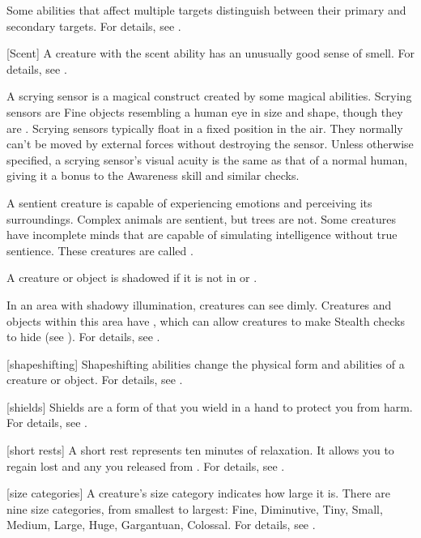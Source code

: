  Some abilities that affect multiple targets distinguish between their primary and secondary targets.
For details, see .

[Scent] A creature with the scent ability has an unusually good sense of smell.
For details, see .

 A scrying sensor is a magical construct created by some magical abilities.
Scrying sensors are Fine objects resembling a human eye in size and shape, though they are .
Scrying sensors typically float in a fixed position in the air.
They normally can't be moved by external forces without destroying the sensor.
Unless otherwise specified, a scrying sensor's visual acuity is the same as that of a normal human, giving it a  bonus to the Awareness skill and similar checks.

 A sentient creature is capable of experiencing emotions and perceiving its surroundings.
Complex animals are sentient, but trees are not.
Some creatures have incomplete minds that are capable of simulating intelligence without true sentience.
These creatures are called .

 A creature or object is shadowed if it is not in  or .

 In an area with shadowy illumination, creatures can see dimly.
Creatures and objects within this area have , which can allow creatures to make Stealth checks to hide (see ).
For details, see .

[shapeshifting] Shapeshifting abilities change the physical form and abilities of a creature or object.
For details, see .

[shields] Shields are a form of  that you wield in a hand to protect you from harm.
For details, see .

[short rests] A short rest represents ten minutes of relaxation.
It allows you to regain lost  and any  you released from .
For details, see .

[size categories] A creature's size category indicates how large it is.
There are nine size categories, from smallest to largest: Fine, Diminutive, Tiny, Small, Medium, Large, Huge, Gargantuan, Colossal.
For details, see .

